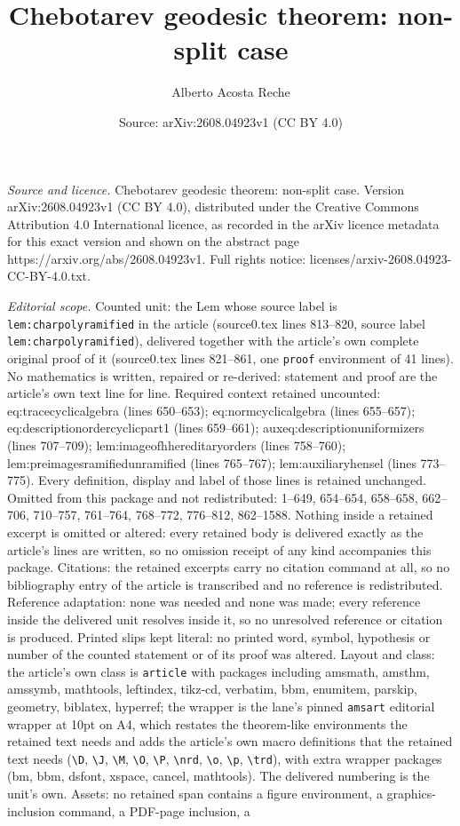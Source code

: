 \documentclass[10pt,a4paper]{amsart}
\title[Chebotarev geodesic theorem: non-split case]{Chebotarev geodesic theorem: non-split case}
\author{Alberto Acosta Reche}
\date{Source: arXiv:2608.04923v1 (CC BY 4.0)}
\begin{document}
\maketitle

\noindent\emph{Source and licence.} Chebotarev geodesic theorem: non-split case. Version arXiv:2608.04923v1 (CC BY 4.0), distributed under the Creative Commons Attribution 4.0 International licence, as recorded in the arXiv licence metadata for this exact version and shown on the abstract page https://arxiv.org/abs/2608.04923v1. Full rights notice: licenses/arxiv-2608.04923-CC-BY-4.0.txt.\par\smallskip

\noindent\textit{Editorial scope.} Counted unit: the Lem whose source label is \texttt{lem:charpolyramified} in the article (source0.tex lines 813--820, source label \texttt{lem:charpolyramified}), delivered together with the article's own complete original proof of it (source0.tex lines 821--861, one \texttt{proof} environment of 41 lines). No mathematics is written, repaired or re-derived: statement and proof are the article's own text line for line. Required context retained uncounted: eq:tracecyclicalgebra (lines 650--653); eq:normcyclicalgebra (lines 655--657); eq:descriptionordercyclicpart1 (lines 659--661); auxeq:descriptionuniformizers (lines 707--709); lem:imageofhhereditaryorders (lines 758--760); lem:preimagesramifiedunramified (lines 765--767); lem:auxiliaryhensel (lines 773--775). Every definition, display and label of those lines is retained unchanged. Omitted from this package and not redistributed: 1--649, 654--654, 658--658, 662--706, 710--757, 761--764, 768--772, 776--812, 862--1588. Nothing inside a retained excerpt is omitted or altered: every retained body is delivered exactly as the article's lines are written, so no omission receipt of any kind accompanies this package. Citations: the retained excerpts carry no citation command at all, so no bibliography entry of the article is transcribed and no reference is redistributed. Reference adaptation: none was needed and none was made; every reference inside the delivered unit resolves inside it, so no unresolved reference or citation is produced. Printed slips kept literal: no printed word, symbol, hypothesis or number of the counted statement or of its proof was altered. Layout and class: the article's own class is \texttt{article} with packages including amsmath, amsthm, amssymb, mathtools, leftindex, tikz-cd, verbatim, bbm, enumitem, parskip, geometry, biblatex, hyperref; the wrapper is the lane's pinned \texttt{amsart} editorial wrapper at 10pt on A4, which restates the theorem-like environments the retained text needs and adds the article's own macro definitions that the retained text needs (\texttt{\textbackslash D}, \texttt{\textbackslash J}, \texttt{\textbackslash M}, \texttt{\textbackslash O}, \texttt{\textbackslash P}, \texttt{\textbackslash nrd}, \texttt{\textbackslash o}, \texttt{\textbackslash p}, \texttt{\textbackslash trd}), with extra wrapper packages (bm, bbm, dsfont, xspace, cancel, mathtools). The delivered numbering is the unit's own. Assets: no retained span contains a figure environment, a graphics-inclusion command, a PDF-page inclusion, a 
\end{document}
